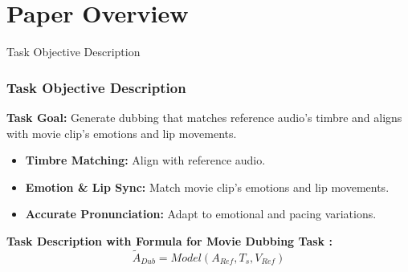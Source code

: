 \section{Paper Overview}

\begin{frame}{Task Objective Description}
    \frametitle{Task Objective Description}
    \textbf{Task Goal:} Generate dubbing that matches reference audio's timbre and aligns with movie clip's emotions and lip movements.
    \begin{itemize}
        \item \textbf{Timbre Matching:} Align with reference audio.
        \item \textbf{Emotion \& Lip Sync:} Match movie clip's emotions and lip movements.
        \item \textbf{Accurate Pronunciation:} Adapt to emotional and pacing variations.
    \end{itemize}
    \vspace{1em}
    \textbf{Task Description with Formula for Movie Dubbing Task :}
    \begin{equation}
        \tilde{A}_{Dub} = Model(A_{Ref}, T_s, V_{Ref})
    \end{equation}
\end{frame}


